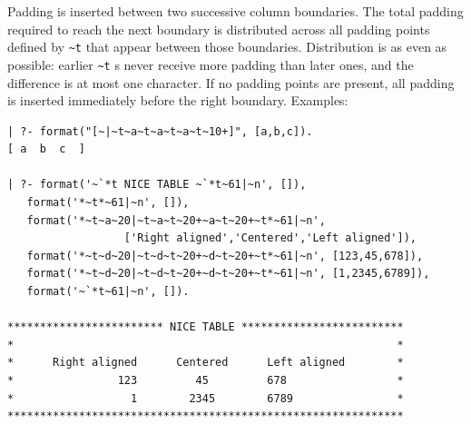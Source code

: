 Padding is inserted between two successive column boundaries. The total padding
required to reach the next boundary is distributed across all padding points
defined by \texttt{\~{}t} that appear between those boundaries. Distribution is
as even as possible: earlier \texttt{\~{}t} s never receive more padding than
later ones, and the difference is at most one character. If no padding points
are present, all padding is inserted immediately before the right
boundary. Examples:

\begin{Code}
\begin{verbatim}
| ?- format("[~|~t~a~t~a~t~a~t~10+]", [a,b,c]).
[ a  b  c  ]

| ?- format('~`*t NICE TABLE ~`*t~61|~n', []),
   format('*~t*~61|~n', []),
   format('*~t~a~20|~t~a~t~20+~a~t~20+~t*~61|~n',
                  ['Right aligned','Centered','Left aligned']),
   format('*~t~d~20|~t~d~t~20+~d~t~20+~t*~61|~n', [123,45,678]),
   format('*~t~d~20|~t~d~t~20+~d~t~20+~t*~61|~n', [1,2345,6789]),
   format('~`*t~61|~n', []).

************************ NICE TABLE *************************
*                                                           *
*      Right aligned      Centered      Left aligned        *
*                123         45         678                 *
*                  1        2345        6789                *
*************************************************************
\end{verbatim}
\end{Code}


